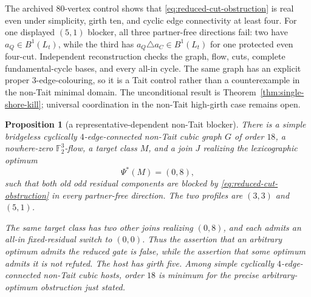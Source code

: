 \documentclass[11pt]{article}
\newtheorem{proposition}[theorem]{Proposition}
\theoremstyle{definition}
\theoremstyle{remark}
\newcommand{\F}{\mathbb F}
\numberwithin{equation}{section}
\begin{document}
The archived 80-vertex control shows that
\eqref{eq:reduced-cut-obstruction} is real even under simplicity, girth
ten, and cyclic edge connectivity at least four.  For one displayed
\((5,1)\) blocker, all three partner-free directions fail: two have
\(a_Q\in B^1(L_t)\), while the third has \(a_Q\triangle a_C\in B^1(L_t)\)
for one protected even four-cut.  Independent reconstruction checks the
graph, flow, cuts, complete fundamental-cycle bases, and every all-in
cycle.  The same graph has an explicit proper 3-edge-colouring, so it is
a Tait control rather than a counterexample in the non-Tait minimal domain.
The unconditional result is Theorem~\ref{thm:single-shore-kill}; universal
coordination in the non-Tait high-girth case remains open.

\begin{proposition}[a representative-dependent non-Tait blocker]
\label{prop:nontait-representative-blocker}
There is a simple bridgeless cyclically \(4\)-edge-connected non-Tait
cubic graph \(G\) of order \(18\), a nowhere-zero
\(\F_2^3\)-flow, a target class \(M\), and a join \(J\) realizing the
lexicographic optimum
\[
                         \Psi^*(M)=(0,8),
\]
such that both old odd residual components are blocked by
\eqref{eq:reduced-cut-obstruction} in every partner-free direction.
The two profiles are \((3,3)\) and \((5,1)\).

The same target class has two other joins realizing \((0,8)\), and each
admits an all-in fixed-residual switch to \((0,0)\).  Thus the assertion
that an arbitrary optimum admits the reduced gate is false, while the
assertion that some optimum admits it is not refuted.
The host has girth five.  Among simple cyclically \(4\)-edge-connected
non-Tait cubic hosts, order \(18\) is minimum for the precise
arbitrary-optimum obstruction just stated.
\end{proposition}
\end{document}
